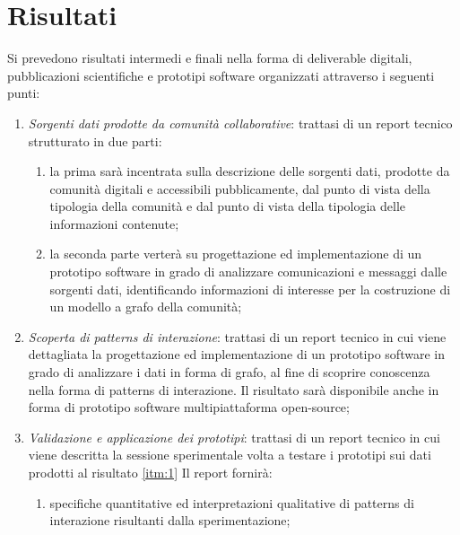 \section{Risultati}

Si prevedono risultati intermedi e finali nella forma di deliverable digitali, pubblicazioni scientifiche e prototipi software organizzati attraverso i seguenti punti:

\begin{enumerate}[label=\theenumi.]

\item \label{itm:1} \textit{Sorgenti dati prodotte da comunit{\`a} collaborative}: trattasi di un report tecnico strutturato in due parti: 

\begin{enumerate}[label=(\alph*)]

\item la prima sar{\`a} incentrata sulla descrizione delle sorgenti dati, prodotte da comunit{\`a} digitali e accessibili pubblicamente, dal punto di vista della tipologia della comunit{\`a} e dal punto di vista della tipologia delle informazioni contenute;

\item la seconda parte verter{\`a} su progettazione ed implementazione di un prototipo software in grado di analizzare comunicazioni e messaggi dalle sorgenti dati, identificando informazioni di interesse per la costruzione di un modello a grafo della comunit{\`a};

\end{enumerate}

\item \textit{Scoperta di patterns di interazione}: trattasi di un report tecnico in cui viene dettagliata la progettazione ed implementazione di un prototipo software in grado di analizzare i dati in forma di grafo, al fine di scoprire conoscenza nella forma di patterns di interazione. Il risultato sar{\`a} disponibile anche in forma di prototipo software multipiattaforma open-source;

\item \textit{Validazione e applicazione dei prototipi}: trattasi di un report tecnico in cui viene descritta la sessione sperimentale volta a testare i prototipi sui dati prodotti al risultato \ref{itm:1} Il report fornir{\`a}:

\begin{enumerate}[label=(\alph*)]

\item specifiche quantitative ed interpretazioni qualitative di patterns di interazione risultanti dalla sperimentazione;


\end{enumerate}
\end{enumerate}
